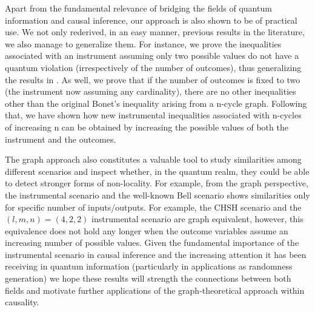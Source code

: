 \documentclass[letterpaper]{article}
\begin{document}
Apart from the fundamental relevance of bridging the fields of quantum
information and causal inference, our approach is also shown to be of practical
use. We not only rederived, in an easy manner, previous results in the literature,
we also manage to generalize them. For instance, we prove the inequalities
associated with an instrument assuming only two possible values do not have a
quantum violation (irrespectively of the number of outcomes), thus generalizing
the results in \cite{henson2014}. As well, we prove that if the number of
outcomes is fixed to two (the instrument now assuming any cardinality), there are no
other inequalities other than the original Bonet's inequality \cite{bonet2001} arising from a n-cycle graph. Following that, we have shown how new
instrumental inequalities associated with n-cycles of increasing n can be
obtained by increasing the possible values of both the instrument and the
outcomes.

The graph approach also constitutes a valuable tool to study similarities among
different scenarios and inspect whether, in the quantum realm, they could be
able to detect stronger forms of non-locality. For example, from the graph
perspective, the instrumental scenario and the well-known Bell scenario shows
similarities only for specific number of inputs/outputs. For example, the CHSH
scenario \cite{CHSH} and the $(l,m,n)=(4,2,2)$ instrumental scenario are graph
equivalent, however, this equivalence does not hold any longer when the outcome
variables assume an increasing number of possible values. Given the fundamental
importance of the instrumental scenario in causal inference and the increasing
attention it has been receiving in quantum information (particularly in
applications as randomness generation) we hope these results will strength the
connections between both fields and motivate further applications of the
graph-theoretical approach within causality.


\end{document}
